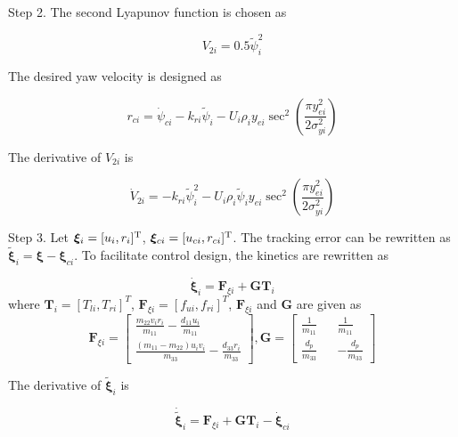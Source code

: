 \documentclass[conference,letterpaper,10.5pt]{IEEEtran}
\begin{document}
Step 2. The second Lyapunov function is chosen as

\begin{equation} \label{V2}
	V_{2i}=0.5\tilde{\psi}^2_i
\end{equation}

The desired yaw velocity is designed as

\begin{equation} \label{desired yaw velocity}
	r_{ci}=\dot{\psi}_{ci}-k_{ri}\tilde{\psi}_i-U_i\rho_iy_{ei}\sec^2(\frac{\pi y^2_{ei}}{2\sigma^2_{yi}})
\end{equation}

The derivative of $V_{2i}$ is 

\begin{equation} \label{V2dot}
	\dot{V}_{2i}=-k_{ri}\tilde{\psi}^2_i-U_i\rho_i\tilde{\psi}_iy_{ei}\sec^2(\frac{\pi y^2_{ei}}{2\sigma^2_{yi}})
\end{equation}

Step 3. Let $\bm{\xi}_i=[u_i,r_i]^{\rm T}$, $\bm{\xi}_{ci}=[u_{ci},r_{ci}]^{\rm T}$. The tracking error can be rewritten as $\tilde{\bm{\xi}}_i=\bm{\xi}-\bm{\xi}_{ci}$. To facilitate control design, the kinetics are rewritten as

\begin{equation} \label{kinetics 2}
	\dot{\bm{\xi}}_i=\bm{F}_{\xi i}+\bm{G}\bm{T}_i
\end{equation}
where $\bm{T}_i=\left[T_{li},T_{ri}\right]^T$, $\bm{F}_{\xi i}=\left[f_{ui},f_{ri}\right]^T$, $\bm{F}_{\xi i}$ and $\bm{G}$ are given as\\
\begin{equation*}
	\bm{F}_{\xi i}=
	\begin{bmatrix}
		\frac{m_{22}v_ir_i}{m_{11}}-\frac{d_{11}u_i}{m_{11}}\\
		\frac{(m_{11}-m_{22})u_iv_i}{m_{33}}-\frac{d_{33}r_i}{m_{33}}
	\end{bmatrix},
	\bm{G}=
	\begin{bmatrix}
		\frac{1}{m_{11}} && \frac{1}{m_{11}}\\
		\frac{d_p}{m_{33}} && -\frac{d_p}{m_{33}}
	\end{bmatrix}
\end{equation*}


The derivative of $\tilde{\bm{\xi}}_i$ is

\begin{equation}
	\dot{\tilde{\bm{\xi}}}_i=\bm{F}_{\xi i}+\bm{G}\bm{T}_i-\dot{\bm{\xi}}_{ci}
\end{equation}
\end{document}
